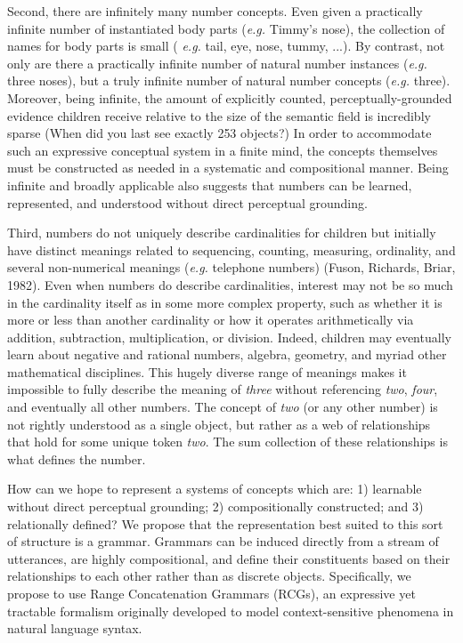 \documentclass[10pt,letterpaper]{article}
\begin{document}

Second, there are infinitely many number concepts. Even given a
practically infinite number of instantiated body parts ({\it e.g.}
Timmy's nose), the collection of names for body parts is small ({\it
  e.g.} tail, eye, nose, tummy, ...). By contrast, not only are there
a practically infinite number of natural number instances ({\it e.g.}
three noses), but a truly infinite number of natural number concepts
({\it e.g.} three). Moreover, being infinite, the amount of explicitly
counted, perceptually-grounded evidence children receive relative to
the size of the semantic field is incredibly sparse (When did you last
see exactly 253 objects?) In order to accommodate such an expressive
conceptual system in a finite mind, the concepts themselves must be
constructed as needed in a systematic and compositional manner.
Being infinite and broadly applicable also suggests that numbers can
be learned, represented, and understood without direct perceptual
grounding.

Third, numbers do not uniquely describe cardinalities for children but
initially have distinct meanings related to sequencing, counting,
measuring, ordinality, and several non-numerical meanings ({\it e.g.}
telephone numbers) (Fuson, Richards, Briar, 1982). Even when numbers
do describe cardinalities, interest may not be so much in the
cardinality itself as in some more complex property, such as whether
it is more or less than another cardinality or how it operates
arithmetically via addition, subtraction, multiplication, or division.
Indeed, children may eventually learn about negative and rational
numbers, algebra, geometry, and myriad other mathematical disciplines.
This hugely diverse range of meanings makes it impossible to fully
describe the meaning of \emph{three} without referencing \emph{two},
\emph{four}, and eventually all other numbers. The concept of
\emph{two} (or any other number) is not rightly understood as a single
object, but rather as a web of relationships that hold for some unique
token \emph{two}. The sum collection of these relationships is what
defines the number.

How can we hope to represent a systems of concepts which are: 1)
learnable without direct perceptual grounding; 2) compositionally
constructed; and 3) relationally defined? We propose that the
representation best suited to this sort of structure is a
grammar. Grammars can be induced directly from a stream of utterances,
are highly compositional, and define their constituents based on their
relationships to each other rather than as discrete
objects. Specifically, we propose to use Range Concatenation Grammars (RCGs),
an expressive yet tractable formalism originally developed to model
context-sensitive phenomena in natural language syntax.
\end{document}
